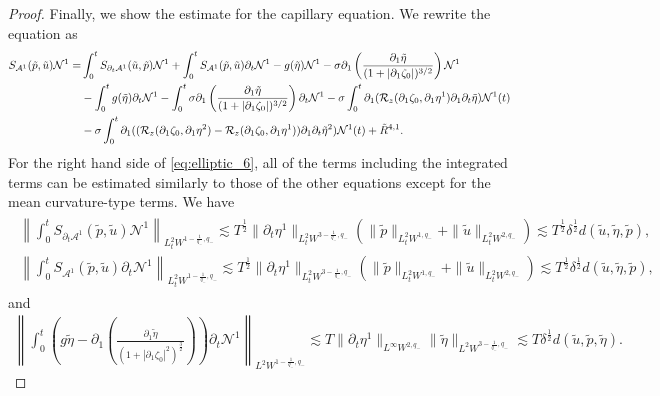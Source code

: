 \documentclass[letterpaper,reqno,10pt,twoside]{amsart}
\theoremstyle{definition}
\theoremstyle{remark}
\def\p{\partial}
\begin{document}
\begin{proof}
			Finally, we show the estimate for the capillary equation. We rewrite the equation as
			\begin{align}{\label{eq:elliptic_6}}
				\begin{aligned}
					S_{\mathcal{A}^1}(\tilde{p},\tilde{u})\mathcal{N}^1=&\int_{0}^{t}S_{\p_{t}\mathcal{A}^{1}}(\tilde{u},\tilde{p})\mathcal{N}^{1}+\int_{0}^{t}S_{\mathcal{A}^{1}}(\tilde{p},\tilde{u})\p_{t}\mathcal{N}^{1}-g(\tilde{\eta})\mathcal{N}^1-\sigma\p_1\left(\frac{\p_1\tilde{\eta}}{(1+|\p_1\zeta_0|)^{3/2}}\right)\mathcal{N}^1\\&-\int_{0}^{t}g(\tilde{\eta})\p_{t}\mathcal{N}^1-\int_{0}^{t}\sigma\p_1\left(\frac{\p_1\tilde{\eta}}{(1+|\p_1\zeta_0|)^{3/2}}\right)\p_{t}\mathcal{N}^1-\sigma\int_{0}^{t}\p_{1}(\mathcal{R}_{z}(\p_{1}\zeta_{0},\p_{1}\eta^{1})\p_{1}\p_{t}\tilde{\eta})\mathcal{N}^{1}(t)\\&-\sigma \int_{0}^{t}\p_{1}((\mathcal{R}_{z}(\p_{1}\zeta_{0},\p_{1}\eta^{2})-\mathcal{R}_{z}(\p_{1}\zeta_{0},\p_{1}\eta^{1}))\p_{1}\p_{t}\tilde{\eta}^{2})\mathcal{N}^{1}(t)+\tilde{R}^{4,1}.
				\end{aligned}
			\end{align}
			For the right hand side of \eqref{eq:elliptic_6}, all of the terms including the integrated terms can be estimated similarly to those of the other equations except for the mean curvature-type terms. We have 
			\begin{align}
				\begin{aligned}
					\left\|\int_{0}^{t}S_{\p_{t}\mathcal{A}^{1}}(\tilde{p},\tilde{u})\mathcal{N}^{1}\right\|_{L_{t}^{2}W^{1-\frac{1}{q_{-}},q_{-}}}\lesssim T^{\frac{1}{2}}\|\p_{t}\eta^{1}\|_{L_{t}^{2}W^{3-\frac{1}{q_{-}},q_{-}}}(\|\tilde{p}\|_{L_{t}^{2}W^{1,q_{-}}}+\|\tilde{u}\|_{L_{t}^{2}W^{2,q_{-}}})\lesssim T^{\frac{1}{2}}\delta^{\frac{1}{2}}d(\tilde{u},\tilde{\eta},\tilde{p}),\\
					\left\|\int_{0}^{t}S_{\mathcal{A}^{1}}(\tilde{p},\tilde{u})\p_{t}\mathcal{N}^{1} \right\|_{L_{t}^{2}W^{1-\frac{1}{q_{-}},q_{-}}}\lesssim T^{\frac{1}{2}}\|\p_{t}\eta^{1}\|_{L_{t}^{2}W^{3-\frac{1}{q_{-}},q_{-}}}(\|\tilde{p}\|_{L_{t}^{2}W^{1,q_{-}}}+\|\tilde{u}\|_{L_{t}^{2}W^{2,q_{-}}})\lesssim T^{\frac{1}{2}}\delta^{\frac{1}{2}}d(\tilde{u},\tilde{\eta},\tilde{p}),
				\end{aligned}
			\end{align}
			and
			\begin{align}
				\left\|\int_{0}^{t}(g\tilde{\eta}-\p_{1}(\frac{\p_{1}\tilde{\eta}}{(1+|\p_{1}\zeta_{0}|^{2})^{\frac{3}{2}}}))\p_{t}\mathcal{N}^{1} \right\|_{L^{2}W^{1-\frac{1}{q_{-}},q_{-}}}\lesssim T\|\p_{t}\eta^{1}\|_{L^{\infty}W^{2,q_{-}}}\|\tilde{\eta}\|_{L^{2}W^{3-\frac{1}{q_{-}},q_{-}}}\lesssim T\delta^{\frac{1}{2}}d(\tilde{u},\tilde{p},\tilde{\eta}).

\end{align}
\end{proof}
\end{document}
